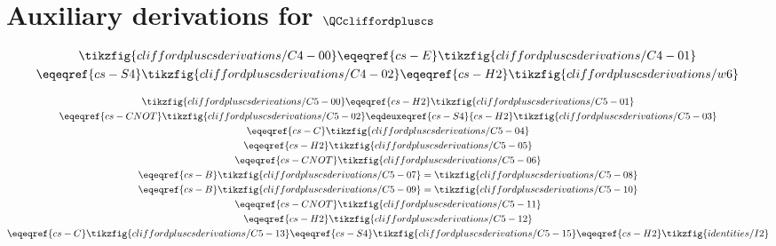 \section{Auxiliary derivations for
  \texorpdfstring{$\QCcliffordpluscs$}{QCcliffordpluscs}}
\label{appendix:cs-decoding-lemmas}

\begin{derivation}\label{lem:cs-C4-dec-eq}
\begin{gather*}
    \tikzfig{cliffordpluscsderivations/C4-00} 
    \eqeqref{cs-E} \tikzfig{cliffordpluscsderivations/C4-01}\\
    \eqeqref{cs-S4}\tikzfig{cliffordpluscsderivations/C4-02}
    \eqeqref{cs-H2}\tikzfig{cliffordpluscsderivations/w6}
\end{gather*}
\end{derivation}

\begin{derivation}\label{lem:cs-C5-dec-eq}
\begin{gather*}
    \tikzfig{cliffordpluscsderivations/C5-00} 
    \eqeqref{cs-H2} \tikzfig{cliffordpluscsderivations/C5-01}\\
    \eqeqref{cs-CNOT}\tikzfig{cliffordpluscsderivations/C5-02}
    \eqdeuxeqref{cs-S4}{cs-H2}\tikzfig{cliffordpluscsderivations/C5-03}\\
    \eqeqref{cs-C}\tikzfig{cliffordpluscsderivations/C5-04}\\
    \eqeqref{cs-H2}\tikzfig{cliffordpluscsderivations/C5-05}\\
    \eqeqref{cs-CNOT}\tikzfig{cliffordpluscsderivations/C5-06}\\
    \eqeqref{cs-B}\tikzfig{cliffordpluscsderivations/C5-07}
    = \tikzfig{cliffordpluscsderivations/C5-08}\\
    \eqeqref{cs-B}\tikzfig{cliffordpluscsderivations/C5-09}
    = \tikzfig{cliffordpluscsderivations/C5-10}\\
    \eqeqref{cs-CNOT}\tikzfig{cliffordpluscsderivations/C5-11}\\
    \eqeqref{cs-H2}\tikzfig{cliffordpluscsderivations/C5-12}\\
    \eqeqref{cs-C}\tikzfig{cliffordpluscsderivations/C5-13}
    \eqeqref{cs-S4} \tikzfig{cliffordpluscsderivations/C5-15}
    \eqeqref{cs-H2} \tikzfig{identities/I2}
\end{gather*}
\end{derivation}

